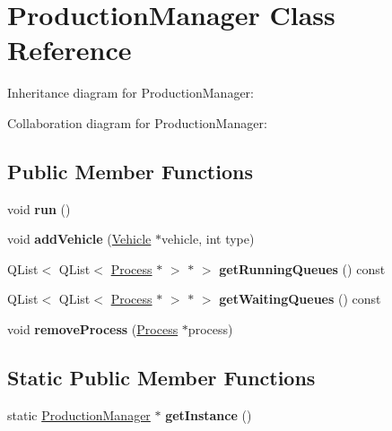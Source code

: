 \hypertarget{classProductionManager}{}\section{Production\+Manager Class Reference}
\label{classProductionManager}


Inheritance diagram for Production\+Manager\+:


Collaboration diagram for Production\+Manager\+:
\subsection*{Public Member Functions}
\begin{DoxyCompactItemize}
\item 
\mbox{\label{classProductionManager_a24830d912caebb883604564b3223ef6d}} 
void {\bfseries run} ()
\item 
\mbox{\label{classProductionManager_a1ece64362cadfbc93342111bf9ca75d3}} 
void {\bfseries add\+Vehicle} (\hyperlink{classVehicle}{Vehicle} $\ast$vehicle, int type)
\item 
\mbox{\label{classProductionManager_a20996508236c487862e1cdcfa2654635}} 
Q\+List$<$ Q\+List$<$ \hyperlink{classProcess}{Process} $\ast$ $>$ $\ast$ $>$ {\bfseries get\+Running\+Queues} () const
\item 
\mbox{\label{classProductionManager_ab1b674af0e5b7b97e483628337661ce3}} 
Q\+List$<$ Q\+List$<$ \hyperlink{classProcess}{Process} $\ast$ $>$ $\ast$ $>$ {\bfseries get\+Waiting\+Queues} () const
\item 
\mbox{\label{classProductionManager_a01f2b2ef8e4d6d8c0af5ac3e81af36dd}} 
void {\bfseries remove\+Process} (\hyperlink{classProcess}{Process} $\ast$process)
\end{DoxyCompactItemize}
\subsection*{Static Public Member Functions}
\begin{DoxyCompactItemize}
\item 
\mbox{\label{classProductionManager_a03904f54aa71ebe4c80513e18c7d586f}} 
static \hyperlink{classProductionManager}{Production\+Manager} $\ast$ {\bfseries get\+Instance} ()
\end{DoxyCompactItemize}
